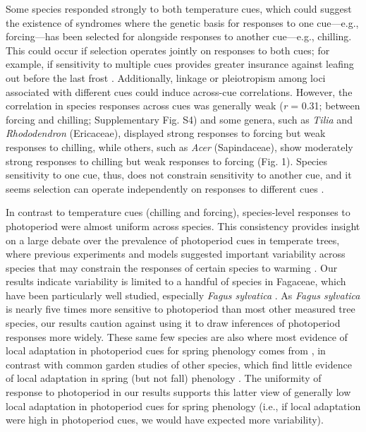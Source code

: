 \documentclass[11pt]{article}
\begin{document}
\par Some species responded strongly to both temperature cues, which could suggest the existence of syndromes where the genetic basis for responses to one cue---e.g.,  forcing---has been selected for alongside responses to another cue---e.g., chilling. This could occur if selection operates jointly on responses to both cues; for example, if sensitivity to multiple cues provides greater insurance against leafing out before the last frost \citep{bonamour2019,memegan2021}. Additionally, linkage or pleiotropism among loci associated with different cues \citep{nakagawa2005} could induce across-cue correlations. However, the correlation in species responses across cues was generally weak (\emph{r} = 0.31; between forcing and chilling; Supplementary Fig. S4) and some genera, such as \emph{Tilia} and \emph{Rhododendron} (Ericaceae), displayed strong responses to forcing but weak responses to chilling, while others, such as \emph{Acer} (Sapindaceae), show moderately strong responses to chilling but weak responses to forcing (Fig. 1). Species sensitivity to one cue, thus, does not constrain sensitivity to another cue, and it seems selection can operate independently on responses to different cues \citep{bonamour2019}.

\par In contrast to temperature cues (chilling and forcing), species-level responses to photoperiod were almost uniform across species. This consistency provides insight on a large debate over the prevalence of photoperiod cues in temperate trees, where previous experiments \citep{Basler:2012,zohner2016} and models \citep[e.g.,][]{Hunter:1992jw,schaber20203} suggested important variability across species that may constrain the responses of certain species to warming \citep{way2015}. Our results indicate variability is limited to a handful of species in Fagaceae, which have been particularly well studied, especially \emph{Fagus sylvatica} \citep[e.g.,][]{Basler:2012,zohner2016,kramer2017}. As \emph{Fagus sylvatica} is nearly five times more sensitive to photoperiod than most other measured tree species, our results caution against using it to draw inferences of photoperiod responses more widely. These same few species are also where most evidence of local adaptation in photoperiod cues for spring phenology comes from \citep[e.g.,][]{kramer2017}, in contrast with common garden studies of other species, which find little evidence of local adaptation in spring (but not fall) phenology \citep{aitken2016}. The uniformity of response to photoperiod in our results supports this latter view of generally low local adaptation in photoperiod cues for spring phenology (i.e., if local adaptation were high in photoperiod cues, we would have expected more variability). 
\end{document}
